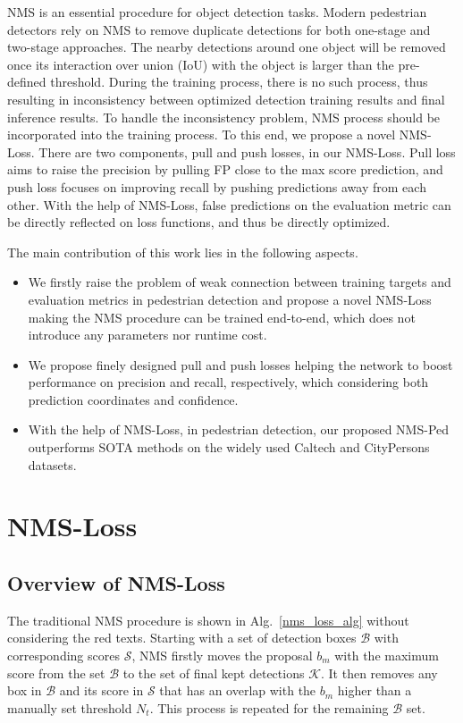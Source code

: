 \documentclass[sigconf]{acmart}
\begin{document}
NMS is an essential procedure for object detection tasks. Modern pedestrian detectors rely on NMS to remove duplicate detections for both one-stage and two-stage approaches. The nearby detections around one object will be removed once its interaction over union (IoU) with the object is larger than the pre-defined threshold. During the training process, there is no such process, thus resulting in inconsistency between optimized detection training results and final inference results. To handle the inconsistency problem, NMS process should be incorporated into the training process. To this end, we propose a novel NMS-Loss. There are two components, pull and push losses, in our NMS-Loss. Pull loss aims to raise the precision by pulling FP close to the max score prediction, and push loss focuses on improving recall by pushing predictions away from each other. With the help of NMS-Loss, false predictions on the evaluation metric can be directly reflected on loss functions, and thus be directly optimized.

The main contribution of this work lies in the following aspects.
\begin{itemize}
    \item We firstly raise the problem of weak connection between training targets and evaluation metrics in pedestrian detection and propose a novel NMS-Loss making the NMS procedure can be trained end-to-end, which does not introduce any parameters nor runtime cost.
    \item We propose finely designed pull and push losses helping the network to boost performance on precision and recall, respectively, which considering both prediction coordinates and confidence.
    \item With the help of NMS-Loss, in pedestrian detection, our proposed NMS-Ped outperforms SOTA methods on the widely used Caltech and CityPersons datasets.
\end{itemize}

\section{NMS-Loss}
\subsection{Overview of NMS-Loss}

The traditional NMS procedure is shown in Alg.~\ref{nms_loss_alg} without considering the red texts. Starting with a set of detection boxes $\mathcal{B}$ with corresponding scores $\mathcal{S}$, NMS firstly moves the proposal $b_{m}$ with the maximum score from the set $\mathcal{B}$ to the set of final kept detections $\mathcal{K}$. It then removes any box in $\mathcal{B}$ and its score in $\mathcal{S}$ that has an overlap with the $b_{m}$ higher than a manually set threshold $N_{t}$. This process is repeated for the remaining $\mathcal{B}$ set.
\end{document}
